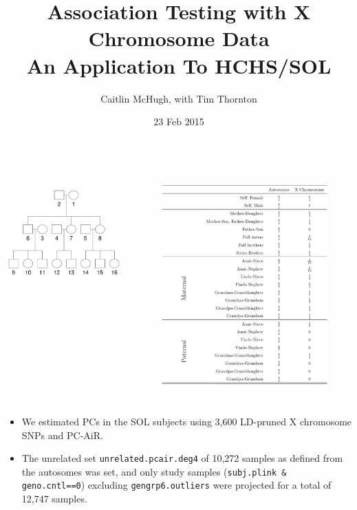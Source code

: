 \documentclass{beamer}
\title[Association Testing with X Chromosome Data] %
{Association Testing with X Chromosome Data\\
An Application To HCHS/SOL}
\author[Caitlin McHugh, with Tim Thornton] %
{Caitlin McHugh, with Tim Thornton}
\institute[University of Washington] %
{
  Department of Biostatistics\\
  University of Washington
}
\date[Short Occasion] %
{23 Feb 2015}
\begin{document}
\begin{frame}
  \titlepage
\end{frame}



\begin{frame}
\begin{columns}
    \begin{column}{0.3\textwidth}
      \centering
      \includegraphics[height=4.5cm]{../pedigree_16individs.pdf}
    \end{column}
    \begin{column}{0.5\textwidth}
      \centering
      \includegraphics[height=8.3cm]{../olga_presentation_26jan15/xchr_kc_values.pdf}
    \end{column}
 \end{columns}
\end{frame}

\begin{frame}
\begin{itemize}
\item We estimated PCs in the SOL subjects using 3,600 LD-pruned X chromosome SNPs and PC-AiR.
\item The unrelated set \texttt{unrelated.pcair.deg4} of 10,272 samples as defined from the autosomes was set, and only study samples (\texttt{subj.plink \& geno.cntl==0}) excluding \texttt{gengrp6.outliers} were projected for a total of 12,747 samples.
\end{itemize}
\end{frame}
\end{document}
